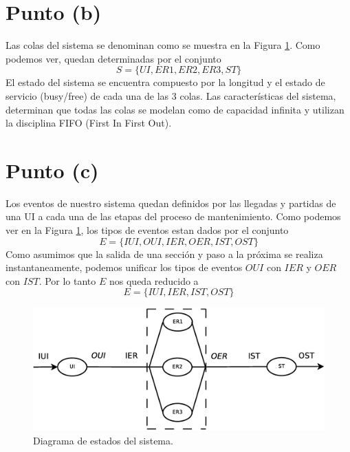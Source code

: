 \documentclass[a4paper,10pt]{article}
\begin{document}
\section{Punto (b)}
Las colas del sistema se denominan como se muestra en la Figura \ref{fig:events_diagram}. Como podemos ver, quedan
determinadas por el conjunto 
\[
S = \{UI, ER1, ER2, ER3, ST\}
\]
El estado del sistema se encuentra compuesto por la longitud y el estado de servicio (busy/free) de cada una de las 3 colas. Las características del sistema, determinan que todas las colas se modelan como de capacidad infinita y utilizan la disciplina FIFO (First In First Out).

\section{Punto (c)}
Los eventos de nuestro sistema quedan definidos por las llegadas y partidas de una UI a cada una de las etapas del proceso de mantenimiento. Como podemos ver en la Figura \ref{fig:events_diagram}, los tipos de eventos estan dados por el conjunto
\[
 E = \{IUI, OUI, IER, OER, IST, OST\}
\]
Como asumimos que la salida de una sección y paso a la próxima se realiza instantaneamente, podemos unificar los tipos de eventos $OUI$ con $IER$ y $OER$ con $IST$. Por lo tanto $E$ nos queda reducido a
\[
 E = \{IUI, IER, IST, OST\}
\]

\begin{figure}[ht]
\begin{center}
\includegraphics[width=12cm]{./states.eps}
\caption{\label{fig:events_diagram} Diagrama de estados del sistema.}
\end{center}
\end{figure}
\end{document}
